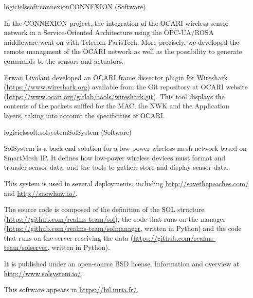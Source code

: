 \documentclass{ra2016}
\begin{document}
\begin{module}{logiciels}{soft:connexion}{CONNEXION (Software)} 

\begin{participants}
\end{participants}

In the CONNEXION project, the integration of the OCARI wireless sensor network
in a Service-Oriented Architecture using the OPC-UA/ROSA middleware went on with Telecom ParisTech. More precisely, we developed the remote managment of the OCARI network as well as the possibility to generate commands to the sensors and actuators. 

Erwan Livolant developed an OCARI frame dissector plugin for Wireshark (\url{https://www.wireshark.org}) available from the Git repository at OCARI website  (\url{https://www.ocari.org/gitlab/tools/wireshark.git}). This tool displays the contents of the packets sniffed for the MAC, the NWK and the Application layers, taking into account the specificities of OCARI.

\end{module}

\begin{module}{logiciels}{soft:solsystem}{SolSystem (Software)}
\label{soft:solsystem}

\begin{participants}
\end{participants}

SolSystem is a back-end solution for a low-power wireless mesh network based on SmartMesh IP.
It defines how low-power wireless devices must format and transfer sensor data, and the tools to gather, store and display sensor data.

This system is used in several deployments, including \url{http://savethepeaches.com/} and \url{http://snowhow.io/}.

The source code is composed of the definition of
the SOL structure (\url{https://github.com/realms-team/sol}),
the code that runs on the manager (\url{https://github.com/realms-team/solmanager}, written in Python) and
the code that runs on the server receiving the data (\url{https://github.com/realms-team/solserver}, written in Python).

It is published under an open-source BSD license. Information and overview at \url{http://www.solsystem.io/}.

This software appears in \url{https://bil.inria.fr/}.

\end{module}
\end{document}
